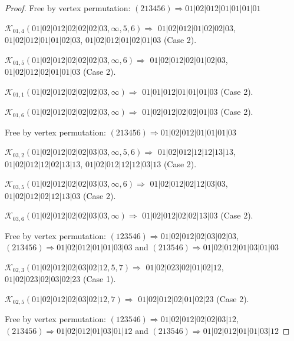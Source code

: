 \documentclass[12pt]{article}
\theoremstyle{plain}
\theoremstyle{definition}
\theoremstyle{remark}
\newcommand{\fancy}[1]{\mathcal{#1}}
\def\K{\fancy{K}}
\begin{document}
\begin{proof}
	
	
	Free by vertex permutation: $(2 1 3 4 5 6)\Rightarrow 01|02|012|01|01|01|01$
	
	
	
	\bigskip
	
	$\K_{01,4}(01|02|012|02|02|02|03,\infty,5, 6)\Rightarrow $ $01|02|012|01|02|02|03$, $01|02|012|01|01|02|03$, $01|02|012|01|02|01|03$ (Case 2).
	
	$\K_{01,5}(01|02|012|02|02|02|03,\infty,6)\Rightarrow $ $01|02|012|02|01|02|03$, $01|02|012|02|01|01|03$ (Case 2).
	
	$\K_{01,1}(01|02|012|02|02|02|03,\infty)\Rightarrow $ $01|01|012|01|01|01|03$ (Case 2).
	
	$\K_{01,6}(01|02|012|02|02|02|03,\infty)\Rightarrow $ $01|02|012|02|02|01|03$ (Case 2).
	
	
	
	Free by vertex permutation: $(2 1 3 4 5 6)\Rightarrow 01|02|012|01|01|01|03$
	
	
	
	\bigskip
	
	$\K_{03,2}(01|02|012|02|02|03|03,\infty,5, 6)\Rightarrow $ $01|02|012|12|12|13|13$, $01|02|012|12|02|13|13$, $01|02|012|12|12|03|13$ (Case 2).
	
	$\K_{03,5}(01|02|012|02|02|03|03,\infty,6)\Rightarrow $ $01|02|012|02|12|03|03$, $01|02|012|02|12|13|03$ (Case 2).
	
	$\K_{03,6}(01|02|012|02|02|03|03,\infty)\Rightarrow $ $01|02|012|02|02|13|03$ (Case 2).
	
	
	
	Free by vertex permutation: $(1 2 3 5 4 6)\Rightarrow 01|02|012|02|03|02|03$, $(2 1 3 4 5 6)\Rightarrow 01|02|012|01|01|03|03$ and $(2 1 3 5 4 6)\Rightarrow 01|02|012|01|03|01|03$
	
	
	
	\bigskip
	
	$\K_{02,3}(01|02|012|02|03|02|12,5, 7)\Rightarrow $ $01|02|023|02|01|02|12$, $01|02|023|02|03|02|23$ (Case 1).
	
	$\K_{02,5}(01|02|012|02|03|02|12,7)\Rightarrow $ $01|02|012|02|01|02|23$ (Case 2).
	
	
	
	Free by vertex permutation: $(1 2 3 5 4 6)\Rightarrow 01|02|012|02|02|03|12$, $(2 1 3 4 5 6)\Rightarrow 01|02|012|01|03|01|12$ and $(2 1 3 5 4 6)\Rightarrow 01|02|012|01|01|03|12$
	
	
	
	\bigskip
	

\end{proof}
\end{document}
